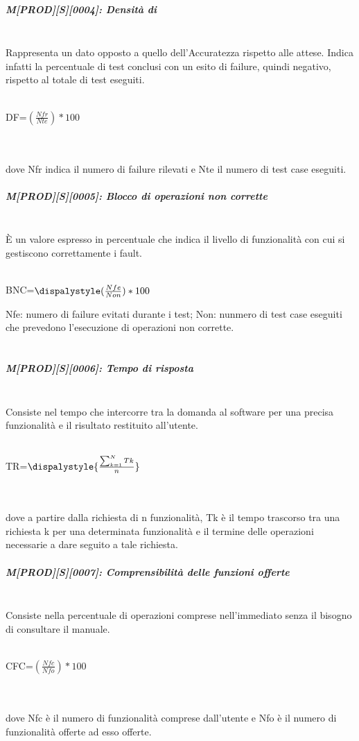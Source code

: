 \subparagraph{M[PROD][S][0004]: Densità di }
~\\Rappresenta un dato opposto a quello dell'Accuratezza rispetto alle attese. Indica infatti la percentuale di test conclusi con un esito di failure, quindi negativo, rispetto al totale di test eseguiti.
    \\\\
    \centerline{DF=${\displaystyle({\frac {Nfr}{Nte}})*100}$}
    \\\\
dove Nfr indica il numero di failure rilevati e Nte il numero di test case eseguiti.
    
\subparagraph{M[PROD][S][0005]: Blocco di operazioni non corrette}
~\\È un valore espresso in percentuale che indica il livello di funzionalità con cui si gestiscono correttamente i fault.
    \\\\
    \centerline{BNC=${\dispalystyle({\frac{Nfe}{Non}})*100}$} Nfe: numero di failure evitati durante i test;
    Non: nunmero di test case eseguiti che prevedono l'esecuzione di operazioni non corrette.
    \\\\
   

\subparagraph{M[PROD][S][0006]: Tempo di risposta}
~\\Consiste nel tempo che intercorre tra la domanda al software per una precisa funzionalità e il risultato restituito all'utente.
    \\\\
    \centerline{TR=${\dispalystyle{\frac{\sum_{k=1}^N Tk}{n}}}$}
    \\\\
dove a partire dalla richiesta di n funzionalità, Tk è il tempo trascorso tra una richiesta k per una determinata funzionalità e il termine delle operazioni necessarie a dare seguito a tale richiesta.

\subparagraph{M[PROD][S][0007]: Comprensibilità delle funzioni offerte}
~\\Consiste nella percentuale di operazioni comprese nell'immediato senza il bisogno di consultare il manuale.
    \\\\
    \centerline{CFC=${\displaystyle({\frac{Nfc}{Nfo}})*100}$}
    \\\\
dove Nfc è il numero di funzionalità comprese dall'utente e Nfo è il numero di funzionalità offerte ad esso offerte.

